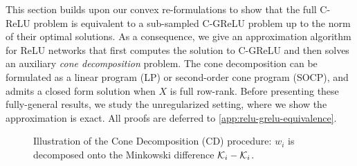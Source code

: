 
This section builds upon our convex re-formulations to show that the full C-ReLU problem is equivalent to a sub-sampled C-GReLU problem up to the norm of their optimal solutions.
As a consequence, we give an approximation algorithm for ReLU networks that first computes the solution to C-GReLU and then solves an auxiliary \emph{cone decomposition} problem.
The cone decomposition can be formulated as a linear program (LP) or second-order cone program (SOCP), and admits a closed form solution when \( X \) is full row-rank.
Before presenting these fully-general results, we study the unregularized setting, where we show the approximation is exact.
All proofs are deferred to \cref{app:relu-grelu-equivalence}.

\begin{figure}
    \centering
    
    \caption{Illustration of the Cone Decomposition (CD) procedure: \( w_i
        \) is decomposed onto the Minkowski difference \( \mathcal{K}_i - \mathcal{K}_i \).}%
    \label{fig:cone-decomp}
\end{figure}

